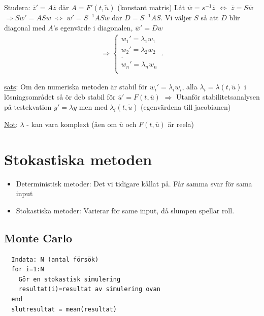 \begin{multicols}{2}
Studera: $\overline{z}'=A\overline{z}$ där $A=F'(t,\tilde{u})$ (konstant matris)
Låt $\overline{w}=s^{-1}\overline{z}$ $\Leftrightarrow$ $\overline{z}=S\overline{w}$
$\Rightarrow S\overline{w}'= AS\overline{w}$ $\Leftrightarrow$ $\overline{w}'=S^{-1}AS\overline{w}$
där $D=S^{-1}AS$. Vi väljer $S$ så att $D$ blir diagonal med $A$'s egenvärde i diagonalen,
$\overline{w}'=Dw$
\begin{align*}
\Rightarrow 
\begin{cases}
  w_1'=\lambda_1w_1\\
  w_2'=\lambda_2w_2\\
  .\\
  w_n'=\lambda_nw_n\\
\end{cases}\,.
\end{align*}

\underline{sats}: Om den numeriska metoden är stabil för $w_i'=\lambda_iw_i$, alla $\lambda_i=\lambda(t,\tilde{u})$
i lösningsområdet så ör deb stabil för $\overline{u}'=F(t,\overline{u})$
$\Rightarrow$ Utanför stabilitetsanalysen på testekvation $y'=\lambda y$ men med $\lambda_i(t,\tilde{u})$
(egenvärdena till jacobianen)

\underline{Not}: $\lambda$ - kan vara komplext (äen om $\overline{u}$ och $F(t,\overline{u})$ är reela)


\section{Stokastiska metoden}
\begin{itemize}
  \item Deterministisk metoder: Det vi tidigare kållat på. Får samma svar för sama input
  \item Stokastiska metoder: Varierar för same input, då slumpen spellar roll.
\end{itemize}

\subsection{Monte Carlo}
\begin{verbatim}
  Indata: N (antal försök)
  for i=1:N
    Gör en stokastisk simulering
    resultat(i)=resultat av simulering ovan
  end 
  slutresultat = mean(resultat)
\end{verbatim}


\end{multicols}
